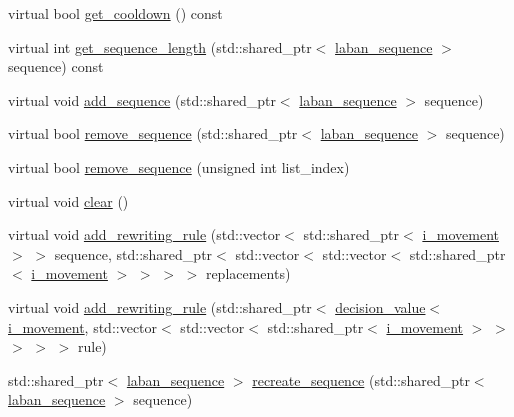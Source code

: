 \begin{DoxyCompactItemize}
\item 
virtual bool \hyperlink{classmae_1_1fl_1_1laban_1_1decision__forest_ada91da61e016fc7359bb18d6fa256bc7}{get\-\_\-cooldown} () const 
\item 
virtual int \hyperlink{classmae_1_1fl_1_1laban_1_1decision__forest_af445fa2708c0e256f6cc4c1209790011}{get\-\_\-sequence\-\_\-length} (std\-::shared\-\_\-ptr$<$ \hyperlink{classmae_1_1fl_1_1laban_1_1laban__sequence}{laban\-\_\-sequence} $>$ sequence) const 
\item 
virtual void \hyperlink{classmae_1_1fl_1_1laban_1_1decision__forest_a4794a8981cd0cfeb55a00ec6a5d01edf}{add\-\_\-sequence} (std\-::shared\-\_\-ptr$<$ \hyperlink{classmae_1_1fl_1_1laban_1_1laban__sequence}{laban\-\_\-sequence} $>$ sequence)
\item 
virtual bool \hyperlink{classmae_1_1fl_1_1laban_1_1decision__forest_a24a8f97645622dbd96543763821dc6e5}{remove\-\_\-sequence} (std\-::shared\-\_\-ptr$<$ \hyperlink{classmae_1_1fl_1_1laban_1_1laban__sequence}{laban\-\_\-sequence} $>$ sequence)
\item 
virtual bool \hyperlink{classmae_1_1fl_1_1laban_1_1decision__forest_a41951d257154b85832f3d6beea13d4e6}{remove\-\_\-sequence} (unsigned int list\-\_\-index)
\item 
virtual void \hyperlink{classmae_1_1fl_1_1laban_1_1decision__forest_aa623f14cda0e8d9566716be9bd6f74d4}{clear} ()
\item 
virtual void \hyperlink{classmae_1_1fl_1_1laban_1_1decision__forest_a639c688ff26b2ecf20f30ae731d7f44f}{add\-\_\-rewriting\-\_\-rule} (std\-::vector$<$ std\-::shared\-\_\-ptr$<$ \hyperlink{classmae_1_1fl_1_1laban_1_1i__movement}{i\-\_\-movement} $>$ $>$ sequence, std\-::shared\-\_\-ptr$<$ std\-::vector$<$ std\-::vector$<$ std\-::shared\-\_\-ptr$<$ \hyperlink{classmae_1_1fl_1_1laban_1_1i__movement}{i\-\_\-movement} $>$ $>$ $>$ $>$ replacements)
\item 
virtual void \hyperlink{classmae_1_1fl_1_1laban_1_1decision__forest_a967fa135b60859542d073b1df27e39c8}{add\-\_\-rewriting\-\_\-rule} (std\-::shared\-\_\-ptr$<$ \hyperlink{classmae_1_1fl_1_1laban_1_1decision__value}{decision\-\_\-value}$<$ \hyperlink{classmae_1_1fl_1_1laban_1_1i__movement}{i\-\_\-movement}, std\-::vector$<$ std\-::vector$<$ std\-::shared\-\_\-ptr$<$ \hyperlink{classmae_1_1fl_1_1laban_1_1i__movement}{i\-\_\-movement} $>$ $>$ $>$ $>$ $>$ rule)
\item 
std\-::shared\-\_\-ptr$<$ \hyperlink{classmae_1_1fl_1_1laban_1_1laban__sequence}{laban\-\_\-sequence} $>$ \hyperlink{classmae_1_1fl_1_1laban_1_1decision__forest_ab295e95474c126e9f61c67897bc456f5}{recreate\-\_\-sequence} (std\-::shared\-\_\-ptr$<$ \hyperlink{classmae_1_1fl_1_1laban_1_1laban__sequence}{laban\-\_\-sequence} $>$ sequence)

\end{DoxyCompactItemize}
